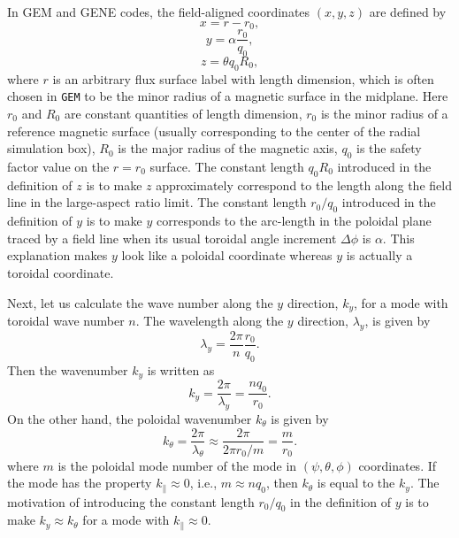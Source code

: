 \documentclass{llncs}
\begin{document}
In GEM{\cite{ychen2007}} and GENE{\cite{gorler2016}} codes, the field-aligned
coordinates $(x, y, z)$ are defined by
\begin{equation}
  x = r - r_0,
\end{equation}
\begin{equation}
  y = \alpha \frac{r_0}{q_0},
\end{equation}
\begin{equation}
  z = \theta q_0 R_0,
\end{equation}
where $r$ is an arbitrary flux surface label with length dimension, which is
often chosen in {\texttt{GEM}} to be the minor radius of a magnetic surface
in the midplane. Here $r_0$ and $R_0$ are constant quantities of length
dimension, $r_0$ is the minor radius of a reference magnetic surface (usually
corresponding to the center of the radial simulation box), $R_0$ is the major
radius of the magnetic axis, $q_0$ is the safety factor value on the $r = r_0$
surface. The constant length $q_0 R_0$ introduced in the definition of $z$ is
to make $z$ approximately correspond to the length along the field line in the
large-aspect ratio limit. The constant length $r_0 / q_0$ introduced in the
definition of $y$ is to make $y$ corresponds to the arc-length in the poloidal
plane traced by a field line when its usual toroidal angle increment $\Delta
\phi$ is $\alpha$. This explanation makes $y$ look like a poloidal coordinate
whereas $y$ is actually a toroidal coordinate.

Next, let us calculate the wave number along the $y$ direction, $k_y$, for a
mode with toroidal wave number $n$. The wavelength along the $y$ direction,
$\lambda_y$, is given by
\begin{equation}
  \label{20-4-20-a1} \lambda_y = \frac{2 \pi}{n}  \frac{r_0}{q_0} .
\end{equation}
Then the wavenumber $k_y$ is written as
\begin{equation}
  \label{20-4-20-a2} k_y = \frac{2 \pi}{\lambda_y} = \frac{n q_0}{r_0} .
\end{equation}
On the other hand, the poloidal wavenumber $k_{\theta}$ is given by
\begin{equation}
  k_{\theta} = \frac{2 \pi}{\lambda_{\theta}} \approx \frac{2 \pi}{2 \pi r_0 /
  m} = \frac{m}{r_0} .
\end{equation}
where $m$ is the poloidal mode number of the mode in $(\psi, \theta, \phi)$
coordinates. If the mode has the property $k_{\parallel} \approx 0$, i.e., $m
\approx n q_0$, then $k_{\theta}$ is equal to the $k_y$. The motivation of
introducing the constant length $r_0 / q_0$ in the definition of $y$ is to
make $k_y \approx k_{\theta}$ for a mode with $k_{\parallel} \approx 0$.
\end{document}
